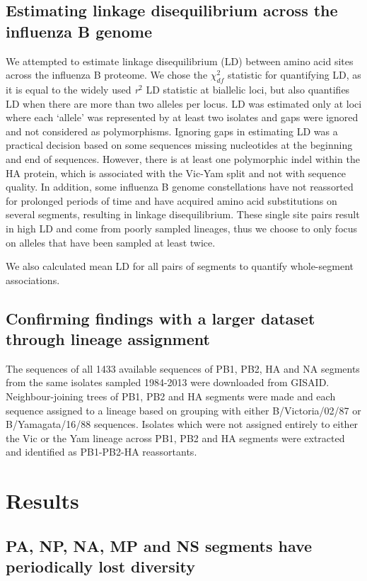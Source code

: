 \documentclass[11pt,oneside,letterpaper]{article}
\begin{document}
\subsection*{Estimating linkage disequilibrium across the influenza B genome}
We attempted to estimate linkage disequilibrium (LD) between amino acid sites across the influenza B proteome.
We chose the $\chi^{2}_{df}$ statistic \cite{zhao2005} for quantifying LD, as it is equal to the widely used \textit{r$^{2}$} LD statistic at biallelic loci, but also quantifies LD when there are more than two alleles per locus.
LD was estimated only at loci where each `allele' was represented by at least two isolates and gaps were ignored and not considered as polymorphisms.
Ignoring gaps in estimating LD was a practical decision based on some sequences missing nucleotides at the beginning and end of sequences.
However, there is at least one polymorphic indel within the HA protein, which is associated with the Vic-Yam split and not with sequence quality.
In addition, some influenza B genome constellations have not reassorted for prolonged periods of time and have acquired amino acid substitutions on several segments, resulting in linkage disequilibrium.
These single site pairs result in high LD and come from poorly sampled lineages, thus we choose to only focus on alleles that have been sampled at least twice.

We also calculated mean LD for all pairs of segments to quantify whole-segment associations.

\subsection*{Confirming findings with a larger dataset through lineage assignment}
The sequences of all 1433 available sequences of PB1, PB2, HA and NA segments from the same isolates sampled 1984-2013 were downloaded from GISAID.
Neighbour-joining trees of PB1, PB2 and HA segments were made and each sequence assigned to a lineage based on grouping with either B/Victoria/02/87 or B/Yamagata/16/88 sequences.
Isolates which were not assigned entirely to either the Vic or the Yam lineage across PB1, PB2 and HA segments were extracted and identified as PB1-PB2-HA reassortants.

\section*{Results}

\subsection*{PA, NP, NA, MP and NS segments have periodically lost diversity}
\end{document}

